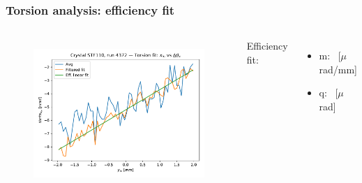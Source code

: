 \documentclass[10pt]{beamer}
\begin{document}
% 
% 





\begin{frame}
\frametitle{Torsion analysis: efficiency fit}

\begin{columns}[c] %

\begin{figure}
\includegraphics[width=\linewidth]{torsion_fit.pdf}\\
\end{figure}

Efficiency fit:
\begin{itemize}[leftmargin=*]
 \item m: \torsionm\ [$\mu$rad/mm]
 \item q: \torsionq\ [$\mu$rad]
\end{itemize}


\end{columns}
\end{frame}
\end{document}

